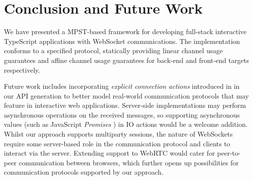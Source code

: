 \section{Conclusion and Future Work}
We have presented a MPST-based framework for developing full-stack interactive
TypeScript applications with WebSocket communications.
The implementation conforms to a specified
protocol, statically providing linear channel usage guarantees and affine
channel usage guarantees for back-end and front-end targets respectively.

Future work includes incorporating \textit{explicit connection actions}
introduced in \cite{ExplicitConnections} in our API generation to better model
real-world communication protocols that may feature in interactive web
applications.
Server-side implementations may perform asynchronous operations on the
received messages, so supporting asynchronous values (such as JavaScript
\textit{Promises} \cite{promise}) in IO actions would be a welcome addition.
Whilst our approach supports multiparty sessions, the nature of
WebSockets require some server-based role in the communication protocol and
clients to interact via the server.
Extending support to WebRTC \cite{WebRTC} would
cater for peer-to-peer communication between browsers, which further opens up
possibilities for communication protocols supported by our approach.


